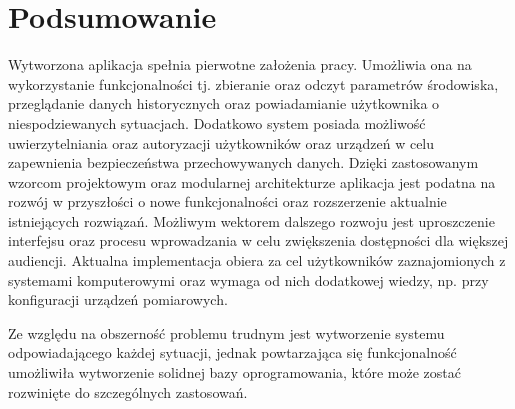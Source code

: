 \chapter{Podsumowanie}
Wytworzona aplikacja spełnia pierwotne założenia pracy. Umożliwia ona na 
wykorzystanie funkcjonalności tj. zbieranie oraz odczyt parametrów środowiska,
przeglądanie danych historycznych oraz powiadamianie użytkownika o niespodziewanych
sytuacjach. Dodatkowo system posiada możliwość uwierzytelniania oraz autoryzacji 
użytkowników oraz urządzeń w celu zapewnienia bezpieczeństwa przechowywanych danych.
Dzięki zastosowanym wzorcom projektowym oraz modularnej architekturze aplikacja
jest podatna na rozwój w przyszłości o nowe funkcjonalności oraz rozszerzenie
aktualnie istniejących rozwiązań. Możliwym wektorem dalszego rozwoju jest
uproszczenie interfejsu oraz procesu wprowadzania w celu zwiększenia dostępności
dla większej audiencji. Aktualna implementacja obiera za cel użytkowników zaznajomionych
z systemami komputerowymi oraz wymaga od nich dodatkowej wiedzy, np. przy konfiguracji
urządzeń pomiarowych. 

Ze względu na obszerność problemu trudnym jest wytworzenie systemu odpowiadającego
każdej sytuacji, jednak powtarzająca się funkcjonalność umożliwiła wytworzenie
solidnej bazy oprogramowania, które może zostać rozwinięte do szczególnych zastosowań.
